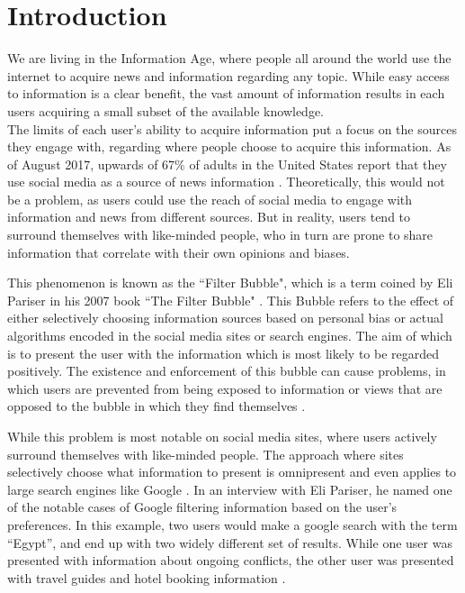 \chapter{Introduction}
We are living in the Information Age, where people all around the world use
the internet to acquire news and information regarding any topic.
While easy access to information is a clear benefit, the vast amount of
information results in each users acquiring a small subset of the available
knowledge.\\
The limits of each user's ability to acquire information put a focus on the
sources they engage with, regarding where people choose to acquire this
information.
As of August 2017, upwards of 67\% of adults in the United States report that
they use social media as a source of news information \citep{journalism2017}.
Theoretically, this would not be a problem, as users could use the reach of
social media to engage with information and news from different sources.
But in reality, users tend to surround themselves with like-minded people, who
in turn are prone to share information that correlate with their own opinions
and biases.\nl

This phenomenon is known as the ``Filter Bubble", which is a term coined by Eli
Pariser in his 2007 book ``The Filter Bubble" \citep{pariser2011filter}.
This Bubble refers to the effect of either selectively choosing information
sources based on personal bias or actual algorithms encoded in the social media
sites or search engines.
The aim of which is to present the user with the information which is most
likely to be regarded positively.
The existence and enforcement of this bubble can cause problems, in which users
are prevented from being exposed to information or views that are opposed to the
bubble in which they find themselves \citep[p.59-73]{pariser2011filter}.\nl

While this problem is most notable on social media sites, where users actively
surround themselves with like-minded people.
The approach where sites selectively choose what information to present is
omnipresent and even applies to large search engines like Google
\citep{filterBubbleDef}.
In an interview with Eli Pariser, he named one of the notable cases of Google
filtering information based on the user's preferences.
In this example, two users would make a google search with the term ``Egypt'',
and end up with two widely different set of results.
While one user was presented with information about ongoing conflicts, the other
user was presented with travel guides and hotel booking information
\citep{nusSduSearch}.